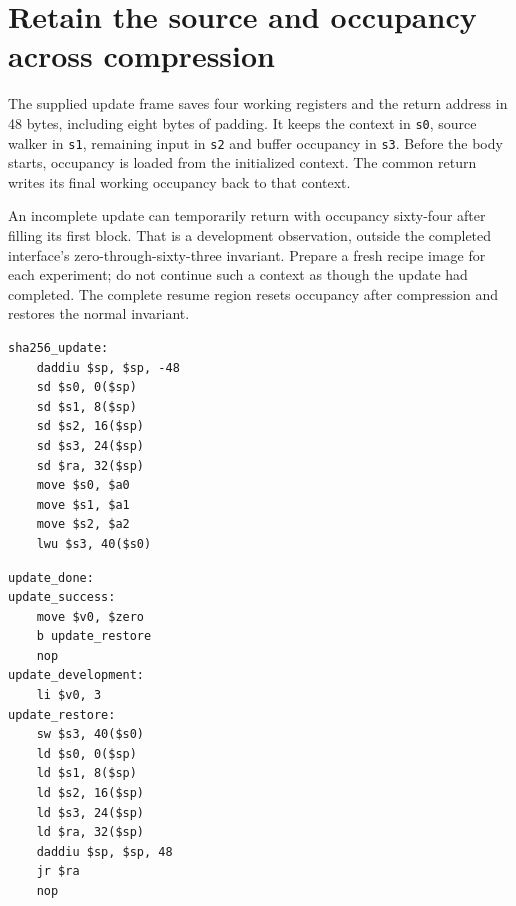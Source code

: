 \section{Retain the source and occupancy across compression}
The supplied update frame saves four working registers and the return address in 48
bytes, including eight bytes of padding. It keeps the context in \texttt{s0}, source
walker in \texttt{s1}, remaining input in \texttt{s2} and buffer occupancy in
\texttt{s3}. Before the body starts, occupancy is loaded from the initialized context.
The common return writes its final working occupancy back to that context.

An incomplete update can temporarily return with occupancy sixty-four after filling
its first block. That is a development observation, outside the completed interface's
zero-through-sixty-three invariant. Prepare a fresh recipe image for each experiment;
do not continue such a context as though the update had completed. The complete resume
region resets occupancy after compression and restores the normal invariant.

\begin{verbatim}
sha256_update:
    daddiu $sp, $sp, -48
    sd $s0, 0($sp)
    sd $s1, 8($sp)
    sd $s2, 16($sp)
    sd $s3, 24($sp)
    sd $ra, 32($sp)
    move $s0, $a0
    move $s1, $a1
    move $s2, $a2
    lwu $s3, 40($s0)
\end{verbatim}

\begin{verbatim}
update_done:
update_success:
    move $v0, $zero
    b update_restore
    nop
update_development:
    li $v0, 3
update_restore:
    sw $s3, 40($s0)
    ld $s0, 0($sp)
    ld $s1, 8($sp)
    ld $s2, 16($sp)
    ld $s3, 24($sp)
    ld $ra, 32($sp)
    daddiu $sp, $sp, 48
    jr $ra
    nop

\end{verbatim}
